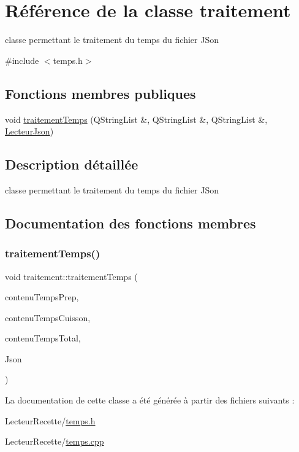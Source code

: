 \hypertarget{classtraitement}{}\section{Référence de la classe traitement}
\label{classtraitement}


classe permettant le traitement du temps du fichier J\+Son  




{\ttfamily \#include $<$temps.\+h$>$}

\subsection*{Fonctions membres publiques}
\begin{DoxyCompactItemize}
\item 
void \hyperlink{classtraitement_a2bc46fa58a25e3f3bf87dfc4fd08ebf8}{traitement\+Temps} (Q\+String\+List \&, Q\+String\+List \&, Q\+String\+List \&, \hyperlink{class_lecteur_json}{Lecteur\+Json})
\end{DoxyCompactItemize}


\subsection{Description détaillée}
classe permettant le traitement du temps du fichier J\+Son 

\subsection{Documentation des fonctions membres}
\mbox{\label{classtraitement_a2bc46fa58a25e3f3bf87dfc4fd08ebf8}} 
\subsubsection{\texorpdfstring{traitement\+Temps()}{traitementTemps()}}
{\footnotesize\ttfamily void traitement\+::traitement\+Temps (\begin{DoxyParamCaption}\item[{Q\+String\+List \&}]{contenu\+Temps\+Prep,  }\item[{Q\+String\+List \&}]{contenu\+Temps\+Cuisson,  }\item[{Q\+String\+List \&}]{contenu\+Temps\+Total,  }\item[{\hyperlink{class_lecteur_json}{Lecteur\+Json}}]{Json }\end{DoxyParamCaption})}



La documentation de cette classe a été générée à partir des fichiers suivants \+:\begin{DoxyCompactItemize}
\item 
Lecteur\+Recette/\hyperlink{temps_8h}{temps.\+h}\item 
Lecteur\+Recette/\hyperlink{temps_8cpp}{temps.\+cpp}\end{DoxyCompactItemize}
